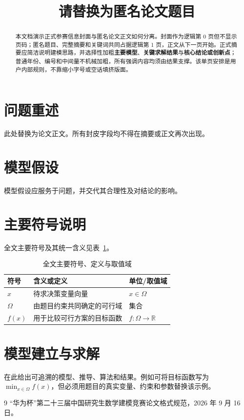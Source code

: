 \documentclass[bwprint]{gmcmthesis}
\title{请替换为匿名论文题目}
\begin{document}
\makeidentitycover
\maketitle

\begin{abstract}
本文档演示正式参赛信息封面与匿名论文正文如何分离。封面作为逻辑第 0 页但不显示页码；匿名题目、完整摘要和关键词共同占据逻辑第 1 页，正文从下一页开始。正式摘要应简洁说明建模思路，并选择性加粗\textbf{主要模型}、\textbf{关键求解结果}与\textbf{核心结论或创新点}；普通年份、编号和中间量不机械加粗，所有强调内容均须由结果支撑。该单页安排是用户内部规则，不靠缩小字号或空话填挤版面。

\end{abstract}

\section{问题重述}
此处替换为论文正文。所有封皮字段均不得在摘要或正文再次出现。


\section{模型假设}
模型假设应服务于问题，并交代其合理性及对结论的影响。

\section{主要符号说明}
全文主要符号及其统一含义见表~\ref{tab:main-symbols}。

\begin{table}[htbp]
  \centering
  \caption{全文主要符号、定义与取值域}
  \label{tab:main-symbols}
  \begin{tabularx}{\textwidth}{>{\centering\arraybackslash}p{}X>{\centering\arraybackslash}p{}}
    \toprule
    符号 & 含义或定义 & 单位/取值域 \\
    \midrule
    $x$ & 待求决策变量向量 & $x\in\Omega$ \\
    $\Omega$ & 由题目约束共同确定的可行域 & 集合 \\
    $f(x)$ & 用于比较可行方案的目标函数 & $f:\Omega\to\mathbb{R}$ \\
    \bottomrule
  \end{tabularx}
\end{table}

\section{模型建立与求解}
在此给出可追溯的模型、推导、算法和结果。例如可将目标函数写为 \(\min_{x\in\Omega} f(x)\)，但必须用题目的真实变量、约束和参数替换该示例。

\clearpage
\begin{thebibliography}{9}
“华为杯”第二十三届中国研究生数学建模竞赛论文格式规范，2026 年 9 月 16 日。
\end{thebibliography}
\end{document}
